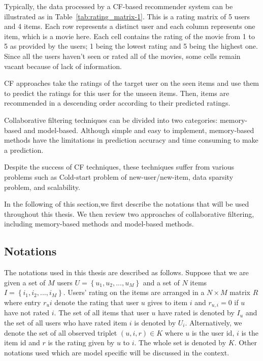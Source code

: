 \documentclass[oneside,13pt]{extreport}
\begin{document}
Typically, the data processed by a CF-based recommender system can be illustrated as in Table~\ref{tab:rating_matrix-1}. This is a rating matrix of 5 users and 4 items. Each row represents a distinct user and each column represents one item, which is a movie here. Each cell contains the rating of the movie from 1 to 5 as provided by the users; 1 being the lowest rating and 5 being the highest one. Since all the users haven't seen or rated all of the movies, some cells remain vacant because of lack of information. 

CF approaches take the ratings of the target user on the seen items and use them to predict the ratings for this user for the unseen items. Then, items are recommended in a descending order according to their predicted ratings.

Collaborative filtering techniques can be divided into two categories: memory-based and model-based. Although simple and easy to implement, memory-based methods have the limitations in prediction accuracy and time consuming to make a prediction. 

Despite the success of CF techniques, these techniques suffer from various problems such as Cold-start problem of new-user/new-item, data sparsity problem, and scalability.

In the following of this section,we first describe the notations that will be used throughout this thesis. We then review two approaches
of collaborative filtering, including memory-based methods and model-based methods.

\subsection{Notations}
The notations used in this thesis are described as follows. Suppose that we are given
a set of $M$ users $U = \left\{ {{u_1},{u_2},...,{u_M}} \right\}$ and a set of $N$ items $I = \left\{ {{i_1},{i_2},...,{i_M}} \right\}$. Users’ rating on the items are arranged in a $N \times M$ matrix $R$ where entry $r_ui$ denote the rating that user $u$ gives to item
$i$ and $r_{u,i} = 0$ if $u$ have not rated $i$. The set of all items that user $u$
have rated is denoted by $I_u$ and the set of all users who have rated item $i$ is denoted by $U_i$. Alternatively, we denote the set of all observed
triplet $\left( {u,i,r} \right) \in K$  where $u$ is the user id, $i$ is the item id
and $r$ is the rating given by $u$ to $i$. The whole set is denoted by $K$.
Other notations used which are model specific will be discussed in the context. 
\end{document}
